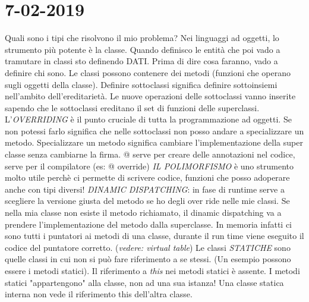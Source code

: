 

\newpage
\section{7-02-2019}
\par
Quali sono i tipi che risolvono il mio problema? \newline
Nei linguaggi ad oggetti, lo strumento più potente è la classe. Quando definisco le entità
che poi vado a tramutare in classi sto definendo DATI. \newline
Prima di dire cosa faranno, vado a definire chi sono. \newline
Le classi possono contenere dei metodi (funzioni che operano sugli oggetti della classe). \newline
Definire sottoclassi significa definire sottoinsiemi nell'ambito dell'ereditarietà. Le nuove operazioni delle sottoclassi vanno inserite sapendo che le sottoclassi ereditano il set di funzioni delle superclassi. \newline
L'\textit{OVERRIDING} è il punto cruciale di tutta la programmazione ad oggetti. Se non potessi farlo significa che nelle sottoclassi non posso andare a specializzare un metodo. Specializzare un metodo significa cambiare l'implementazione della super classe senza cambiarne la firma. \newline
@ serve per creare delle annotazioni nel codice, serve per il compilatore (es: @ override)
\newline
\textit{IL POLIMORFISMO} è uno strumento molto utile perchè ci permette di scrivere codice, funzioni che posso adoperare anche con tipi diversi!
\newline
\textit{DINAMIC DISPATCHING}: in fase di runtime serve a scegliere la versione giusta 
del metodo se ho degli over ride nelle mie classi. Se nella mia classe non esiste il metodo richiamato, il dinamic dispatching va a prendere l'implementazione del metodo dalla superclasse. In memoria infatti ci sono tutti i puntatori ai metodi di una classe, durante il run time viene eseguito il codice del puntatore corretto. (\textit{vedere: virtual table})
\newline
Le classi \textit{STATICHE} sono quelle classi in cui non si può fare riferimento a se stessi. (Un esempio possono essere i metodi statici). Il riferimento a \textit{this} nei metodi statici è assente. I metodi statici "appartengono" alla classe, non ad una sua istanza! Una classe statica interna non vede il riferimento this dell'altra classe. \newline
